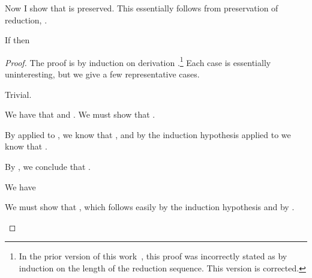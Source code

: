 Now I show that  is preserved.
This essentially follows from preservation of reduction, .
\begin{lemma}
  \label{lem:abs-cc:m:red*}
  If \im{\tlenv \vdash \te \stepstar \tepr} then \im{\absccmodel{\tlenv} \vdash
    \absccmodel{\te} \stepstar \absccmodel{\tepr}}
\end{lemma}
\begin{proof}
  The proof is by induction on derivation
  \im{\tstepjudg[\stepstar]{\tlenv}{\te}{\tepr}}.\footnote{In the prior version
    of this work~\cite{bowman2018:cccc}, this proof was incorrectly stated as by
    induction on the length of the reduction sequence.
    This version is corrected.}
  Each case is essentially uninteresting, but we give a few representative cases.
  \begin{proofcases}
    \item {}

      Trivial.

    \item {}

      We have that \im{\te \step \teone} and \im{\teone \stepstar \tepr}.
      We must show that \im{\absccmodel{\te} \stepstar \absccmodel{\tepr}}.

      By  applied to \im{\te \stepstar \teone}, we know
      that \im{\absccmodel{\te} \stepstar \absccmodel{\teone}}, and by the
      induction hypothesis applied to \im{\teone \stepstar \tepr} we know
      that \im{\absccmodel{\teone} \stepstar \absccmodel{\tepr}}.

      By \slang {}, we conclude that \im{\absccmodel{\te}
        \stepstar \absccmodel{\tepr}}.

    \item {}

      We have
      \im{
      \inferrule*[right=\rulename{Red-Cong-Let}]
      {\tstepjudg[\stepstar]{\tlenv}{\teone}{\teonepr} \\
       \tstepjudg[\stepstar]{\tlenv,\tx = \tepr}{\tetwo}{\tetwopr}}
      {\tstepjudg[\stepstar]{\tlenv}{\tlete{\tx}{\teone}{\tetwo}}{\tlete{\tx}{\teonepr}{\tetwopr}}}
      }

      We must show that \im{\absccmodel{\tlete{\tx}{\teone}{\tetwo}} \stepstar
        \absccmodel{\tlete{\tx}{\teonepr}{\tetwopr}}}, which follows easily by
      the induction hypothesis and by \slang {}.


\end{proofcases}
\end{proof}
